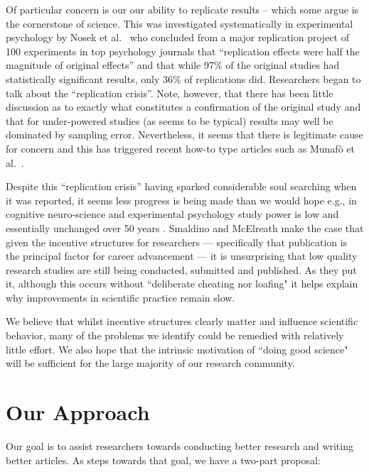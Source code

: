 \documentclass[preprint,10pt]{elsarticle}
\begin{document}
Of particular concern is our our ability to replicate results -- which some argue is the cornerstone of science.  This was investigated systematically in experimental psychology by Nosek et al.~\cite{Open15} who concluded from a major replication project of 100 experiments in top psychology journals that ``replication effects were half the magnitude of original effects'' and that while 97\% of the original studies had statistically significant results, only 36\% of replications did.  Researchers began to talk about the ``replication crisis''.  Note, however, that there has been little discussion as to exactly what constitutes a confirmation of the original study \cite{Spen16} and that for under-powered studies (as seems to be typical) results may well be dominated by sampling error.  Nevertheless, it seems that there is legitimate cause for concern and this has triggered recent how-to type articles such as Munaf{\`o} et al.~\cite{Muna17}.

Despite this ``replication crisis'' having sparked considerable soul searching when it was reported, it seems less progress is being made than we would hope e.g., in cognitive neuro-science and experimental psychology study power is low and essentially unchanged over 50 years \cite{Szuc17}.  Smaldino and McElreath \cite{Smal16} make the case that given the incentive structures for researchers --- specifically that publication is the principal factor for career advancement --- it is unsurprising that low quality research studies are still being conducted, submitted and published.  As they put it, although this occurs without ``deliberate cheating nor loafing" it helps explain why improvements in scientific practice remain slow.  

We believe that whilst incentive structures clearly matter and influence scientific behavior, many of the problems we identify could be remedied with relatively little effort.  We also hope that the intrinsic motivation of ``doing good science" will be sufficient for the large majority of our research community.

\section{Our Approach}\label{Sec:Approach}


Our goal is to assist researchers towards conducting better research and writing better articles.  As steps towards that goal, we have a two-part proposal:
 
\end{document}
